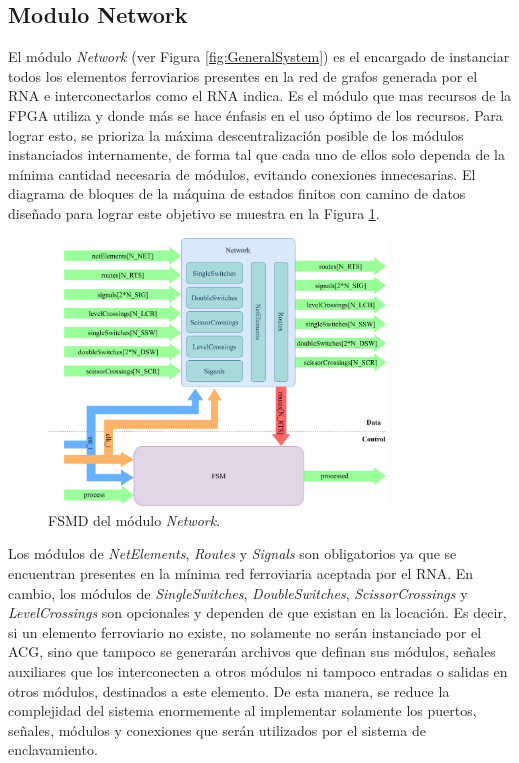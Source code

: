 \subsection{Modulo Network}
	\label{sec:network}
	
	El módulo \textit{Network} (ver Figura \ref{fig:GeneralSystem}) es el encargado de instanciar todos los elementos ferroviarios presentes en la red de grafos generada por el RNA e interconectarlos como el RNA indica. Es el módulo que mas recursos de la FPGA utiliza y donde más se hace énfasis en el uso óptimo de los recursos. Para lograr esto, se prioriza la máxima descentralización posible de los módulos instanciados internamente, de forma tal que cada uno de ellos solo dependa de la mínima cantidad necesaria de módulos, evitando conexiones innecesarias. El diagrama de bloques de la máquina de estados finitos con camino de datos diseñado para lograr este objetivo se muestra en la Figura \ref{fig:Network_module}.
	
	\begin{figure}[H]
		\centering
		\includegraphics[width=0.8\textwidth]{Figuras/Network_module.png}
		\centering\caption{FSMD del módulo \textit{Network}.}
		\label{fig:Network_module}
	\end{figure}
	
	Los módulos de \textit{NetElements}, \textit{Routes} y \textit{Signals} son obligatorios ya que se encuentran presentes en la mínima red ferroviaria aceptada por el RNA. En cambio, los módulos de \textit{SingleSwitches}, \textit{DoubleSwitches}, \textit{ScissorCrossings} y \textit{LevelCrossings} son opcionales y dependen de que existan en la locación. Es decir, si un elemento ferroviario no existe, no solamente no serán instanciado por el ACG, sino que tampoco se generarán archivos que definan sus módulos, señales auxiliares que los interconecten a otros módulos ni tampoco entradas o salidas en otros módulos, destinados a este elemento. De esta manera, se reduce la complejidad del sistema enormemente al implementar solamente los puertos, señales, módulos y conexiones que serán utilizados por el sistema de enclavamiento.
	
